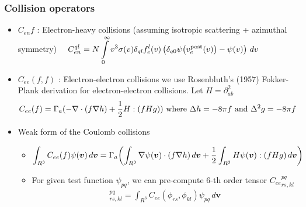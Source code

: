 \documentclass[mathserif, aspectratio=169]{beamer}
\newcommand{\vect}[1]{\boldsymbol{#1}}
\newcommand{\of}[1]{\mleft( #1 \mright)}
\newcommand{\myint}{\int\limits}
\newcommand{\diff}[1]{\, d#1}
\begin{document}
\begin{frame}
	\frametitle{Collision operators}
	\begin{itemize}
		\item $C_{en} f$ : Electron-heavy collisions (assuming isotropic scattering + azimuthal symmetry) 
		$
		\displaystyle
		\quad 
		C_{en}^{ql} 
		=
		N \myint_{0}^{\infty} 
		v^3\sigma(v)\delta_{ql}
		f_e^{l}\of{v}
		\left(
		\delta_{q0}\psi\of{v_e^\text{post}\of{v}} - \psi\of{v} 
		\right)
		\diff{v} 
		$ 
		\item $C_{ee}(f,f)$ : Electron-electron collisions we use Rosenbluth's (1957) Fokker-Plank derivation for electron-electron collisions. Let $H=\partial^2_{ab}$
		\begin{align}
			C_{ee}(f) &= \Gamma_a(-\nabla \cdot (f \nabla h ) + \frac{1}{2} H : \of{f H g}) \text{ where } \Delta h  = -8\pi f \text{ and } \Delta^2 g =-8\pi f	
		\end{align}
		\item Weak form of the Coulomb collisions
		\begin{itemize}
			\item 
			\begin{align}
				\int_{R^3} C_{ee}(f) \psi(\vect{v})\diff{\vect{v}} = \Gamma_a \of{\int_{R^3} \nabla \psi\of{\vect{v}} \cdot (f \nabla h ) 	\diff{\vect{v}}  + \frac{1}{2} \int_{R^3} H\psi\of{\vect{v}} : \of{f H g} \diff{\vect{v}}} 
			\end{align}
			\item For given test function $\psi_{pq}$, we can pre-compute 6-th order tensor ${C_{ee}}_{rs,kl}^{pq}$
			\begin{align}
				[C_{ee}]_{rs,kl}^{pq} = \int_{R^3} C_{ee}(\phi_{rs}, \phi_{kl}) \psi_{pq} \diff{\vect{v}} 
			\end{align}
		\end{itemize}

	\end{itemize}
\end{frame}
\end{document}
